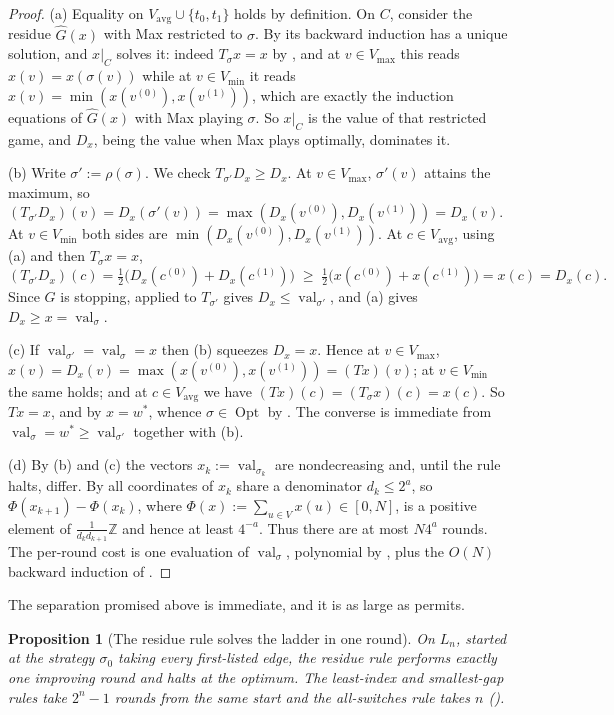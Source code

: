 \documentclass[11pt]{article}
\theoremstyle{plain}
\newtheorem{proposition}[theorem]{Proposition}
\theoremstyle{definition}
\DeclareMathOperator{\val}{val}
\DeclareMathOperator{\Opt}{Opt}
\newcommand{\Vmax}{V_{\max}}
\newcommand{\Vmin}{V_{\min}}
\newcommand{\Vavg}{V_{\mathrm{avg}}}
\begin{document}
\begin{proof}
(a) Equality on $\Vavg\cup\{t_0,t_1\}$ holds by definition. On $C$,
consider the residue $\widehat G(x)$ with Max restricted to $\sigma$. By
 its backward induction has a unique solution, and
$x|_C$ solves it: indeed $T_\sigma x=x$ by
, and at $v\in\Vmax$ this reads
$x(v)=x(\sigma(v))$ while at $v\in\Vmin$ it reads
$x(v)=\min(x(v^{(0)}),x(v^{(1)}))$, which are exactly the induction
equations of $\widehat G(x)$ with Max playing $\sigma$. So $x|_C$ is the
value of that restricted game, and $D_x$, being the value when Max plays
optimally, dominates it.

(b) Write $\sigma':=\rho(\sigma)$. We check $T_{\sigma'}D_x\ge D_x$. At
$v\in\Vmax$, $\sigma'(v)$ attains the maximum, so
$(T_{\sigma'}D_x)(v)=D_x(\sigma'(v))=\max(D_x(v^{(0)}),D_x(v^{(1)}))=D_x(v)$.
At $v\in\Vmin$ both sides are $\min(D_x(v^{(0)}),D_x(v^{(1)}))$. At
$c\in\Vavg$, using (a) and then $T_\sigma x=x$,
\[
  (T_{\sigma'}D_x)(c)=\tfrac12\bigl(D_x(c^{(0)})+D_x(c^{(1)})\bigr)
  \;\ge\;\tfrac12\bigl(x(c^{(0)})+x(c^{(1)})\bigr)=x(c)=D_x(c).
\]
Since $G$ is stopping,  applied to $T_{\sigma'}$
gives $D_x\le\val_{\sigma'}$, and (a) gives $D_x\ge x=\val_\sigma$.

(c) If $\val_{\sigma'}=\val_\sigma=x$ then (b) squeezes $D_x=x$. Hence at
$v\in\Vmax$, $x(v)=D_x(v)=\max(x(v^{(0)}),x(v^{(1)}))=(Tx)(v)$; at
$v\in\Vmin$ the same holds; and at $c\in\Vavg$ we have
$(Tx)(c)=(T_\sigma x)(c)=x(c)$. So $Tx=x$, and by
 $x=w^\ast$, whence
$\sigma\in\Opt$ by . The converse is immediate
from $\val_\sigma=w^\ast\ge\val_{\sigma'}$ together with (b).

(d) By (b) and (c) the vectors $x_k:=\val_{\sigma_k}$ are nondecreasing
and, until the rule halts, differ. By  all
coordinates of $x_k$ share a denominator $d_k\le2^{a}$, so
$\Phi(x_{k+1})-\Phi(x_k)$, where $\Phi(x):=\sum_{u\in V}x(u)\in[0,N]$, is
a positive element of $\frac1{d_kd_{k+1}}\mathbb Z$ and hence at least
$4^{-a}$. Thus there are at most $N4^{a}$ rounds. The per-round cost is
one evaluation of $\val_\sigma$, polynomial by ,
plus the $O(N)$ backward induction of .
\end{proof}

The separation promised above is immediate, and it is as large as
 permits.

\begin{proposition}[The residue rule solves the ladder in one
round]\label{prop:residue-ladder}
On $L_n$, started at the strategy $\sigma_0$ taking every first-listed
edge, the residue rule performs exactly one improving round and halts at
the optimum. The least-index and smallest-gap rules take $2^{n}-1$ rounds
from the same start and the all-switches rule takes $n$
().
\end{proposition}
\end{document}
